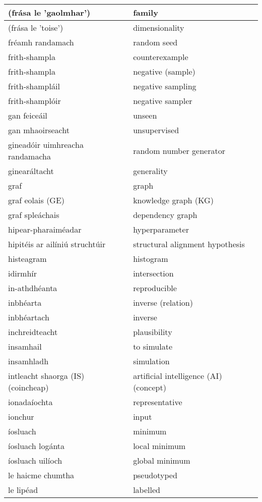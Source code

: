 \begin{longtable}{|l|l|}
		(frása le 'gaolmhar')&family\\ \hline 
		(frása le 'toise')&dimensionality\\ \hline 
		fréamh randamach&random seed\\ \hline 
		frith-shampla&counterexample\\ \hline 
		frith-shampla&negative (sample)\\ \hline 
		frith-shampláil&negative sampling\\ \hline 
		frith-shamplóir&negative sampler\\ \hline 
		gan feiceáil&unseen\\ \hline 
		gan mhaoirseacht&unsupervised\\ \hline 
		gineadóir uimhreacha randamacha&random number generator\\ \hline 
		ginearáltacht&generality\\ \hline 
		graf&graph\\ \hline 
		graf eolais (GE)&knowledge graph (KG)\\ \hline 
		graf spleáchais&dependency graph\\ \hline 
		hipear-pharaiméadar&hyperparameter\\ \hline 
		hipitéis ar ailíniú struchtúir&structural alignment hypothesis\\ \hline 
		histeagram&histogram\\ \hline 
		idirmhír&intersection\\ \hline 
		in-athdhéanta&reproducible\\ \hline 
		inbhéarta&inverse (relation)\\ \hline 
		inbhéartach&inverse\\ \hline 
		inchreidteacht&plausibility\\ \hline 
		insamhail&to simulate\\ \hline 
		insamhladh&simulation\\ \hline 
		intleacht shaorga (IS) (coincheap)&artificial intelligence (AI) (concept)\\ \hline 
		ionadaíochta&representative\\ \hline 
		ionchur&input\\ \hline 
		íosluach&minimum\\ \hline 
		íosluach logánta&local minimum\\ \hline 
		íosluach uilíoch&global minimum\\ \hline 
		le haicme chumtha&pseudotyped\\ \hline 
		le lipéad&labelled\\ \hline 

\end{longtable}
